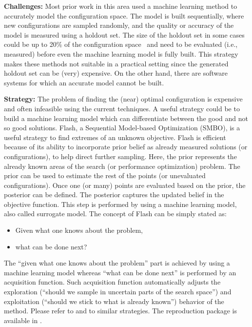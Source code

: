 \documentclass[sigconf,anonymous,review]{acmart}
\newcommand\TODO[1]{\textcolor{ScarletRed}{\textbf{\colorbox{yellow}{\small TODO:}} \emph{#1}}\xspace}
\begin{document}
\noindent\textbf{Challenges: } Most prior work in this area used a machine learning method to accurately model the
configuration space. 
The model is built sequentially, where new configurations are sampled randomly, and the quality
or accuracy of the model is measured using a holdout set. The size of the holdout set in some cases could be up to 20\% of the configuration space~\cite{nair2017using} and need to be evaluated (i.e., measured) before even the machine learning model is fully built. This strategy makes these methods not suitable in a practical setting since the generated holdout set can be (very) expensive. On the other hand, there are software systems for which an accurate model cannot be built. 

\noindent\textbf{Strategy: } The problem of finding the (near) optimal configuration is expensive and often infeasible using the current techniques. A useful strategy could be to build a machine learning model which can differentiate between the good and not so good solutions. Flash, a Sequential Model-based Optimization (SMBO), is a useful
strategy to find extremes of an unknown objective. Flash is
efficient because of its ability to incorporate prior belief as
already measured solutions (or configurations), to help direct
further sampling. Here, the prior represents the already
known areas of the search (or performance optimization) problem. The prior can be used to estimate the rest of the
points (or unevaluated configurations). Once one (or many) points are evaluated based on the prior,
the posterior can be defined. The posterior captures the updated belief in
the objective function. This step is performed by using a
machine learning model, also called surrogate model. 
The concept of Flash can be simply stated as:
\begin{itemize}
\item Given what one knows about the problem,
\item what can be done next?
\end{itemize}
The ``given what one knows about the problem'' part is
achieved by using a machine learning model whereas ``what can be done next'' is performed by an acquisition function.
Such acquisition function automatically adjusts the exploration
(``should we sample in uncertain parts of the search
space'') and exploitation (``should we stick to what is already
known'') behavior of the method. Please refer to  \cite{nair2018finding} and  \cite{nair2017using,nair2017faster, jamshidi2016uncertainty} to similar strategies. The reproduction package is available in .
\end{document}
